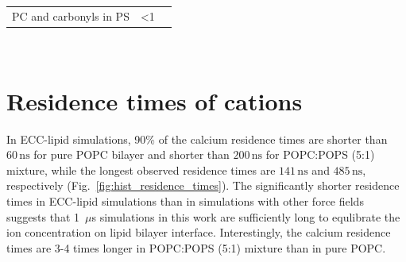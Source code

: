 \documentclass[journal=jpcbfk,manuscript=article]{achemso}
\begin{document}
\begin{table}[h!]
\begin{tabular}{ l | c c }
      PC and carbonyls in PS &   <1   &        \\
  \end{tabular} \\
\end{table} 


\pagebreak
\section{Residence times of cations}

%
In ECC-lipid simulations, 90\% of the calcium residence times are shorter than $60\,\mathrm{ns}$ for pure POPC bilayer
and shorter than $200\,\mathrm{ns}$ for POPC:POPS (5:1) mixture, while the
longest observed residence times are $141\,\mathrm{ns}$ and $485\,\mathrm{ns}$, respectively (Fig.~\ref{fig:hist_residence_times}).
The significantly shorter residence times in ECC-lipid simulations than in simulations 
with other force fields~\cite{javanainen17, catte16} suggests that 1~$\mu$s simulations in this work
are sufficiently long to equlibrate the ion concentration on lipid bilayer interface.
Interestingly, the calcium residence times are 3-4 times longer in POPC:POPS (5:1) mixture than in
pure POPC.
\end{document}
